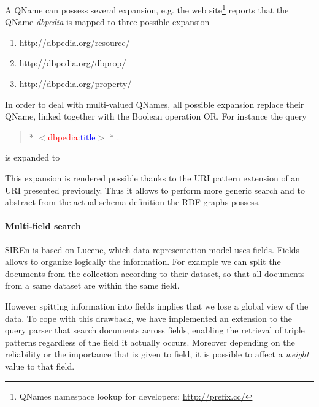 A QName can possess several expansion, e.g. the web
site\footnote{QNames namespace lookup for developers:
\url{http://prefix.cc/}} reports that the QName \emph{dbpedia} is mapped to
three possible expansion
\begin{enumerate}
  \item \url{http://dbpedia.org/resource/}
  \item \url{http://dbpedia.org/dbprop/}
  \item \url{http://dbpedia.org/property/}
\end{enumerate}
In order to deal with multi-valued QNames, all possible expansion replace their
QName, linked together with the Boolean operation OR. For instance the query
\begin{quotation}
* $<$\textcolor{red}{dbpedia}:\textcolor{blue}{title}$>$ * .
\end{quotation}
is expanded to
\begin{quotation}
%
\end{quotation}
This expansion is rendered possible thanks to the URI pattern extension of an
URI presented previously. Thus it allows to perform more generic search and to
abstract from the actual schema definition the RDF graphs possess.

\paragraph{Multi-field search}

SIREn is based on Lucene, which data representation model uses fields. Fields
allows to organize logically the information. For example we can split the
documents from the collection according to their dataset, so that all documents
from a same dataset are within the same field.

However spitting information into fields implies that we lose a global view of
the data. To cope with this drawback, we have implemented an extension to the
query parser that search documents across fields, enabling the retrieval of
triple patterns regardless of the field it actually occurs. Moreover depending
on the reliability or the importance that is given to field, it is possible to
affect a \emph{weight} value to that field.

